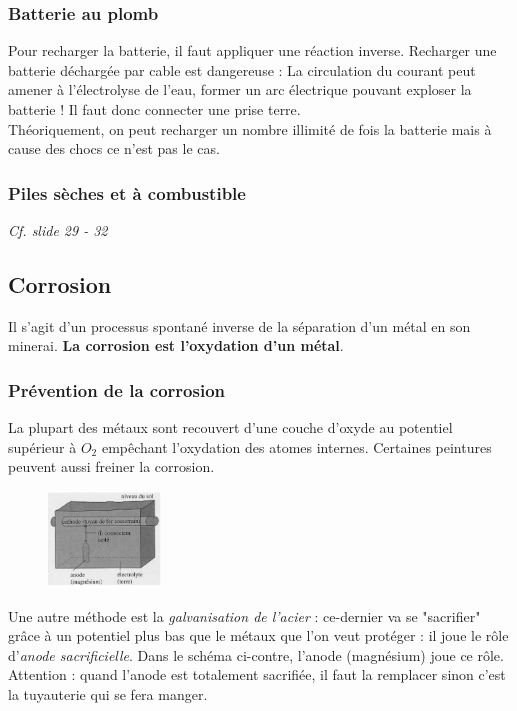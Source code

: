 \documentclass[12pt, a4paper]{article}
\begin{document}
\subsubsection*{Batterie au plomb}
Pour recharger la batterie, il faut appliquer une réaction inverse. Recharger une batterie déchargée par cable est dangereuse : La circulation du courant peut amener à l'électrolyse de l'eau, former un arc électrique pouvant exploser la batterie ! Il faut donc connecter une prise terre.\\
Théoriquement, on peut recharger un nombre illimité de fois la batterie mais à cause des chocs ce n'est pas le cas.

\subsubsection*{Piles sèches et à combustible}
\textit{Cf. slide 29 - 32}

\subsection{Corrosion}
Il s'agit d'un processus spontané inverse de la séparation d'un métal en son minerai. \textbf{La corrosion est l'oxydation d'un métal}.

\subsubsection*{Prévention de la corrosion}
La plupart des métaux sont recouvert d'une couche d'oxyde au potentiel supérieur à $O_2$ empêchant l'oxydation des atomes internes. Certaines peintures peuvent aussi freiner la corrosion.\\

\begin{figure}
\includegraphics[width=3cm]{image4.png}
\end{figure}
Une autre méthode est la \textit{galvanisation de l'acier} : ce-dernier va  se "sacrifier" grâce à un potentiel plus bas que le métaux que l'on veut protéger : il joue le rôle d'\textit{anode sacrificielle}. Dans le schéma ci-contre, l'anode (magnésium) joue ce rôle. Attention : quand l'anode est totalement sacrifiée, il faut la remplacer sinon c'est la tuyauterie qui se fera manger.
\end{document}
